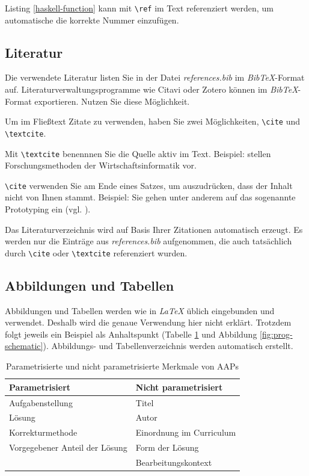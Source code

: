 Listing \ref{haskell-function} kann mit \lstinline|\ref| im Text referenziert werden, um automatische die korrekte Nummer einzufügen.

\subsection{Literatur}

Die verwendete Literatur listen Sie in der Datei \textit{references.bib} im \textit{BibTeX}-Format auf. Literaturverwaltungsprogramme wie Citavi oder Zotero können im \textit{BibTeX}-Format exportieren. Nutzen Sie diese Möglichkeit.

Um im Fließtext Zitate zu verwenden, haben Sie zwei Möglichkeiten, \lstinline|\cite| und \lstinline|\textcite|.

Mit \lstinline|\textcite| benennnen Sie die Quelle aktiv im Text. Beispiel: \textcite[1]{wildeMethodenspektrumWirtschaftsinformatik2006} stellen Forschungsmethoden der Wirtschaftsinformatik vor. 

\lstinline|\cite| verwenden Sie am Ende eines Satzes, um auszudrücken, dass der Inhalt nicht von Ihnen stammt. Beispiel: Sie gehen unter anderem auf das sogenannte Prototyping ein (vgl. \cite[1]{wildeMethodenspektrumWirtschaftsinformatik2006}). 

Das Literaturverzeichnis wird auf Basis Ihrer Zitationen automatisch erzeugt. Es werden nur die Einträge aus \textit{references.bib} aufgenommen, die auch tatsächlich durch \lstinline|\cite| oder \lstinline|\textcite| referenziert wurden.

\subsection{Abbildungen und Tabellen}

Abbildungen und Tabellen werden wie in \textit{LaTeX} üblich eingebunden und verwendet. Deshalb wird die genaue Verwendung hier nicht erklärt. Trotzdem folgt jeweils ein Beispiel als Anhaltspunkt (Tabelle \ref{parametrisierte-merkmale} und Abbildung \ref{fig:prog-schematic}). Abbildungs- und Tabellenverzeichnis werden automatisch erstellt.

\begin{table}
    \centering
    \begin{tabular}{|l|l|}
        \hline
        \textbf{Parametrisiert} & \textbf{Nicht parametrisiert}\\
        \hline
        Aufgabenstellung & Titel\\
        Lösung & Autor\\
        Korrekturmethode & Einordnung im Curriculum\\
        Vorgegebener Anteil der Lösung & Form der Lösung\\
        & Bearbeitungskontext\\
        \hline
    \end{tabular}
    \caption{Parametrisierte und nicht parametrisierte Merkmale von AAPs}
    \label{parametrisierte-merkmale}
\end{table}


